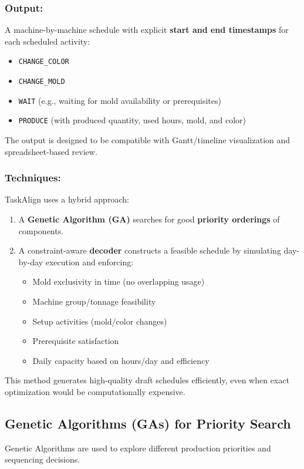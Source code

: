 \subsubsection*{Output:}
A machine-by-machine schedule with explicit \textbf{start and end timestamps} for each scheduled activity:
\begin{itemize}
    \item \texttt{CHANGE\_COLOR}
    \item \texttt{CHANGE\_MOLD}
    \item \texttt{WAIT} (e.g., waiting for mold availability or prerequisites)
    \item \texttt{PRODUCE} (with produced quantity, used hours, mold, and color)
\end{itemize}
The output is designed to be compatible with Gantt/timeline visualization and spreadsheet-based review.

\subsubsection*{Techniques:}
TaskAlign uses a hybrid approach:
\begin{enumerate}
    \item A \textbf{Genetic Algorithm (GA)} searches for good \textbf{priority orderings} of components.
    \item A constraint-aware \textbf{decoder} constructs a feasible schedule by simulating day-by-day execution and enforcing:
    \begin{itemize}
        \item Mold exclusivity in time (no overlapping usage)
        \item Machine group/tonnage feasibility
        \item Setup activities (mold/color changes)
        \item Prerequisite satisfaction
        \item Daily capacity based on hours/day and efficiency
    \end{itemize}
\end{enumerate}
This method generates high-quality draft schedules efficiently, even when exact optimization would be computationally expensive.

\subsection{Genetic Algorithms (GAs) for Priority Search}
Genetic Algorithms are used to explore different production priorities and sequencing decisions.

